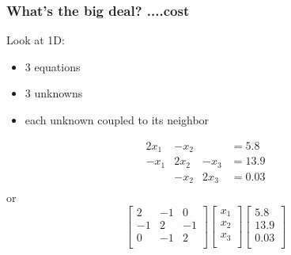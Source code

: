 \documentclass[10pt]{beamer}
\begin{document}
\begin{frame}
\frametitle{What's the big deal? ....cost}
Look at 1D:
\begin{itemize}
  \item 3 equations
  \item 3 unknowns
  \item each unknown coupled to its neighbor
\end{itemize}
\begin{equation*}
\begin{matrix}
2x_1 & -x_2 & & = 5.8\\
-x_1 & 2x_2 & -x_3& = 13.9\\
     & -x_2 & 2x_3& = 0.03\\
\end{matrix}
\end{equation*}
or 
\begin{equation*}
  \begin{bmatrix}
  2 & -1 & 0\\
  -1 &  2 & -1\\
  0 & -1 & 2\\
  \end{bmatrix}
  \begin{bmatrix}
  x_1\\x_2\\x_3\\
  \end{bmatrix}
  \begin{bmatrix}
  5.8\\13.9\\0.03\\
  \end{bmatrix}
\end{equation*}
\end{frame}
\end{document}
